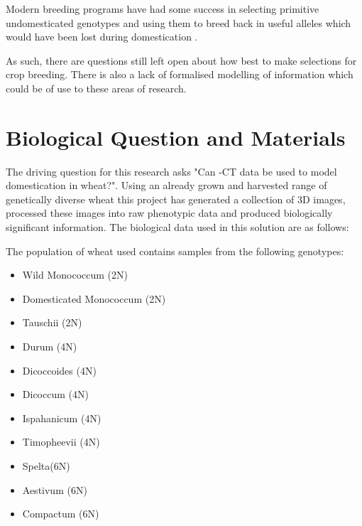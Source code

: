 \documentclass[11pt]{report}
\begin{document}
Modern breeding programs have had some success in selecting primitive undomesticated genotypes and using them to breed back in useful alleles which would have been lost during domestication \cite{Charmet2011}.

As such, there are questions still left open about how best to make selections for crop breeding. There is also a lack of formalised modelling of information which could be of use to these areas of research.

\section{Biological Question and Materials}
\label{sec-1-2}

The driving question for this research asks "Can \textmu{}-CT data be used to model domestication in wheat?". Using an already grown and harvested range of genetically diverse wheat this project has generated a collection of 3D images, processed these images into raw phenotypic data and produced biologically significant information. The biological data used in this solution are as follows:

The population of wheat used contains samples from the following genotypes:

\begin{multicols}{3}

  \begin{itemize}
  \item Wild Monococcum (2N)
  \item Domesticated Monococcum (2N)
  \item Tauschii (2N)
  \end{itemize}

  \columnbreak

  \begin{itemize}
  \item Durum (4N)
  \item Dicoccoides (4N)
  \item Dicoccum (4N)
  \item Ispahanicum (4N)
  \item Timopheevii (4N)
  \end{itemize}

  \columnbreak

  \begin{itemize}
  \item Spelta(6N)
  \item Aestivum (6N)
  \item Compactum (6N)
  \end{itemize}

\end{multicols}
\end{document}
